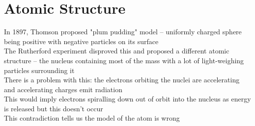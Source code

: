\documentclass[a4paper, 11pt, fleqn, normalem]{report}
\begin{document}
\section{Atomic Structure}
In 1897, Thomson proposed "plum pudding" model -- uniformly charged sphere being positive with negative particles on its surface \\
The Rutherford experiment disproved this and proposed a different atomic structure -- the nucleus containing most of the mass with a lot of light-weighing particles surrounding it \\
There is a problem with this: the electrons orbiting the nuclei are accelerating and accelerating charges emit radiation \\
This would imply electrons spiralling down out of orbit into the nucleus as energy is released but this doesn't occur \\
This contradiction tells us the model of the atom is wrong
\end{document}
